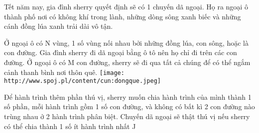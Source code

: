 Tết năm nay, gia đình sherry quyết định sẽ có 1 chuyến dã ngoại. Họ ra ngoại ô thành phố nơi có không khí trong lành, những dòng sông xanh biếc và những cánh đồng lúa xanh trải dài vô tận.  

   Ở ngoại ô có N vùng, 1 số vùng nối nhau bởi những đồng lúa, con sông, hoặc là con đường. Gia đình sherry đi dã ngoại bằng ô tô nên họ chỉ đi trên các con đường. Ở ngoại ô có M con đường, sherry sẽ đi qua tất cả chúng để có thể ngắm cảnh thanh bình nơi thôn quê.  
\texttt{[image: http://www.spoj.pl/content/cun:dongque.jpeg]}

   Để hành trình thêm phần thú vị, sherry muốn chia hành trình của mình thành 1 số phần, mỗi hành trình gồm 1 số con đường, và không có bất kì 2 con đường nào trùng nhau ở 2 hành trình phân biệt. Chuyến dã ngoại sẽ thật thú vị nếu sherry có thể chia thành 1 số ít hành trình nhất ^^